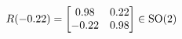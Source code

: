 \documentclass[preview]{standalone}
\begin{document}
\begin{align*}
\special{dvisvgm:raw <g id='unique000'>}R(-0.22) = \begin{bmatrix} 0.98 & 0.22 \\ -0.22 & 0.98 \end{bmatrix} \in \text{SO}(2)\special{dvisvgm:raw </g>}
\end{align*}
\end{document}
